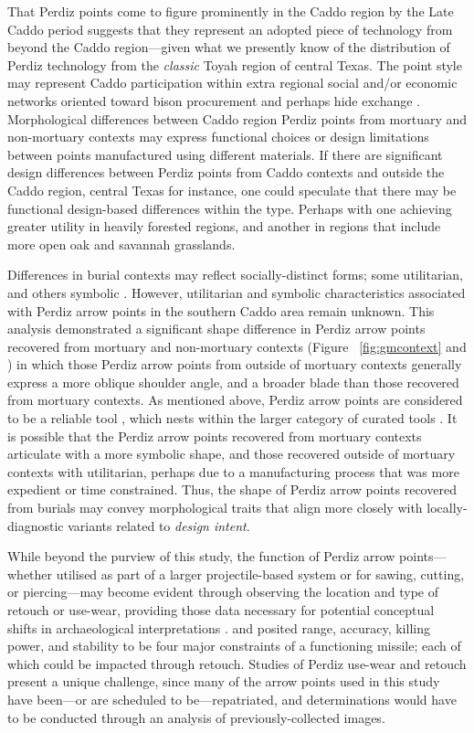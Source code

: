 \documentclass[review]{elsarticle}
\begin{document}
That Perdiz points come to figure prominently in the Caddo region by the Late Caddo period suggests that they represent an adopted piece of technology from beyond the Caddo region—given what we presently know of the distribution of Perdiz technology from the \textit{classic} Toyah region of central Texas. The point style may represent Caddo participation within extra regional social and/or economic networks oriented toward bison procurement and perhaps hide exchange \citep{RN9002}. Morphological differences between Caddo region Perdiz points from mortuary and non-mortuary contexts may express functional choices or design limitations between points manufactured using different materials. If there are significant design differences between Perdiz points from Caddo contexts and outside the Caddo region, central Texas for instance, one could speculate that there may be functional design-based differences within the type. Perhaps with one achieving greater utility in heavily forested regions, and another in regions that include more open oak and savannah grasslands.

Differences in burial contexts may reflect socially-distinct forms; some utilitarian, and others symbolic \citep[69]{RN8989}. However, utilitarian and symbolic characteristics associated with Perdiz arrow points in the southern Caddo area remain unknown. This analysis demonstrated a significant shape difference in Perdiz arrow points recovered from mortuary and non-mortuary contexts (Figure ~\ref{fig:gmcontext} and \citealt{RN8980}) in which those Perdiz arrow points from outside of mortuary contexts generally express a more oblique shoulder angle, and a broader blade than those recovered from mortuary contexts. As mentioned above, Perdiz arrow points are considered to be a reliable tool \citep{RN5873}, which nests within the larger category of curated tools \citep{RN5880}. It is possible that the Perdiz arrow points recovered from mortuary contexts articulate with a more symbolic shape, and those recovered outside of mortuary contexts with utilitarian, perhaps due to a manufacturing process that was more expedient or time constrained. Thus, the shape of Perdiz arrow points recovered from burials may convey morphological traits that align more closely with locally-diagnostic variants related to \textit{design intent}.

While beyond the purview of this study, the function of Perdiz arrow points---whether utilised as part of a larger projectile-based system or for sawing, cutting, or piercing---may become evident through observing the location and type of retouch or use-wear, providing those data necessary for potential conceptual shifts in archaeological interpretations \citep{RN8990,RN8991,RN8992,RN6342}. \citet{RN8994} and \citet{RN8993} posited range, accuracy, killing power, and stability to be four major constraints of a functioning missile; each of which could be impacted through retouch. Studies of Perdiz use-wear and retouch present a unique challenge, since many of the arrow points used in this study have been---or are scheduled to be---repatriated, and determinations would have to be conducted through an analysis of previously-collected images.
\end{document}
